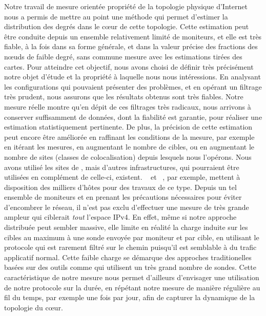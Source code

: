 Notre travail de mesure orientée propriété de la topologie physique d'Internet
nous a permis de mettre au point une méthode qui permet d'estimer la
distribution des degrés dans le c\oe{}ur de cette topologie. Cette estimation
peut être conduite depuis un ensemble relativement limité de moniteurs, et elle
est très fiable, à la fois dans sa forme générale, et dans la valeur précise des
fractions des n\oe{}uds de faible degré, sans commune mesure avec les
estimations tirées des cartes. Pour atteindre cet objectif, nous avons choisi de
définir très précisément notre objet d'étude et la propriété à laquelle nous
nous intéressions. En analysant les configurations qui pouvaient présenter des
problèmes, et en opérant un filtrage très prudent, nous assurons que les
résultats obtenus sont très fiables. Notre mesure réelle montre qu'en dépit de
ces filtrages très radicaux, nous arrivons à conserver suffisamment de données,
dont la fiabilité est garantie, pour réaliser une estimation statistiquement
pertinente. De plus, la précision de cette estimation peut encore être améliorée
en raffinant les conditions de la mesure, par exemple en itérant les mesures, en
augmentant le nombre de cibles, ou en augmentant le nombre de sites (classes de
colocalisation) depuis lesquels nous l'opérons. Nous avons utilisé les sites de
\planetlab, mais d'autres infrastructures, qui pourraient être utilisées en
complément de celle-ci, existent. \dimes~\cite{dimes} et
\ripeatlas~\cite{ripeatlas}, par exemple, mettent à disposition des milliers
d'hôtes pour des travaux de ce type. Depuis un tel ensemble de moniteurs et en
prenant les précautions nécessaires pour éviter d'encombrer le réseau, il n'est
pas exclu d'effectuer une mesure de très grande ampleur qui ciblerait {\em tout}
l'espace IPv4. En effet, même si notre approche distribuée peut sembler massive,
elle limite en réalité la charge induite sur les cibles au maximum à une sonde
envoyée par moniteur et par cible, en utilisant le protocole \udp qui est
rarement filtré sur le chemin puisqu'il est semblable à du trafic applicatif
normal. Cette faible charge se démarque des approches traditionelles basées sur
des outils comme \traceroute qui utilisent un très grand nombre de sondes.
Cette caractéristique de notre mesure nous permet d'ailleurs d'envisager une
utilisation de notre protocole sur la durée, en répétant notre mesure de manière
régulière au fil du temps, par exemple une fois par jour, afin de capturer la
dynamique de la topologie du c\oe{}ur.

